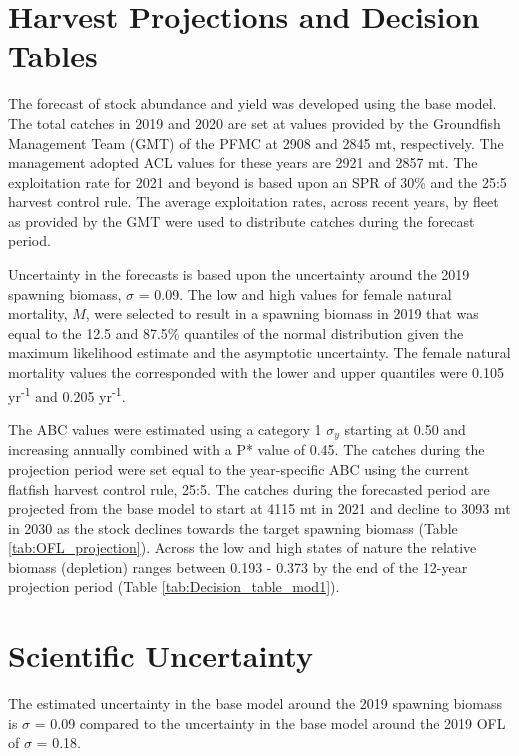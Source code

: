 \documentclass[12pt,]{article}
\begin{document}
\section{Harvest Projections and Decision
Tables}\label{harvest-projections-and-decision-tables}

The forecast of stock abundance and yield was developed using the base
model. The total catches in 2019 and 2020 are set at values provided by
the Groundfish Management Team (GMT) of the PFMC at 2908 and 2845 mt,
respectively. The management adopted ACL values for these years are 2921
and 2857 mt. The exploitation rate for 2021 and beyond is based upon an
SPR of 30\% and the 25:5 harvest control rule. The average exploitation
rates, across recent years, by fleet as provided by the GMT were used to
distribute catches during the forecast period.

Uncertainty in the forecasts is based upon the uncertainty around the
2019 spawning biomass, \(\sigma\) = 0.09. The low and high values for
female natural mortality, \(M\), were selected to result in a spawning
biomass in 2019 that was equal to the 12.5 and 87.5\% quantiles of the
normal distribution given the maximum likelihood estimate and the
asymptotic uncertainty. The female natural mortality values the
corresponded with the lower and upper quantiles were 0.105
yr\textsuperscript{-1} and 0.205 yr\textsuperscript{-1}.

The ABC values were estimated using a category 1 \(\sigma_y\) starting
at 0.50 and increasing annually combined with a P* value of 0.45. The
catches during the projection period were set equal to the year-specific
ABC using the current flatfish harvest control rule, 25:5. The catches
during the forecasted period are projected from the base model to start
at 4115 mt in 2021 and decline to 3093 mt in 2030 as the stock declines
towards the target spawning biomass (Table \ref{tab:OFL_projection}).
Across the low and high states of nature the relative biomass
(depletion) ranges between 0.193 - 0.373 by the end of the 12-year
projection period (Table \ref{tab:Decision_table_mod1}).

\section{Scientific Uncertainty}\label{scientific-uncertainty-1}

The estimated uncertainty in the base model around the 2019 spawning
biomass is \(\sigma\) = 0.09 compared to the uncertainty in the base
model around the 2019 OFL of \(\sigma\) = 0.18.
\end{document}
